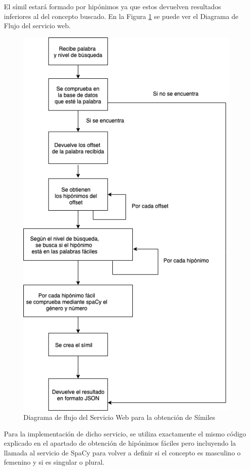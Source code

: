 El símil estará formado por hipónimos ya que estos devuelven resultados inferiores al del concepto buscado.
En la Figura \ref{fig:swsimil} se puede ver el Diagrama de Flujo del servicio web.
\begin{figure}[!h]
	\includegraphics[width=.9\textwidth]{Imagenes/Bitmap/Capitulo4/ServiciosWeb/DiagramaFlujoSimil.png}
	\centering
	\caption{Diagrama de flujo del Servicio Web para la obtención de Símiles}
	\label{fig:swsimil}
\end{figure}

Para la implementación de dicho servicio, se utiliza exactamente el mismo código explicado en el apartado de obtención de hipónimos fáciles pero incluyendo la llamada al servicio de SpaCy para volver a definir si el concepto es masculino o femenino y si es singular o plural.

